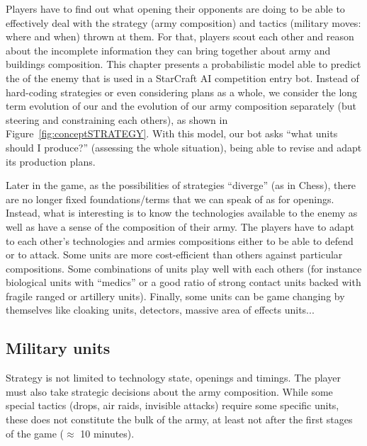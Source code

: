 Players have to find out what opening their opponents are doing to be able to effectively deal with the strategy (army composition) and tactics (military moves: where and when) thrown at them. For that, players scout each other and reason about the incomplete information they can bring together about army and buildings composition. This chapter presents a probabilistic model able to predict the \textit{} of the enemy that is used in a StarCraft AI competition entry bot. Instead of hard-coding strategies or even considering plans as a whole, we consider the long term evolution of our  and the evolution of our army composition separately (but steering and constraining each others), as shown in Figure~\ref{fig:conceptSTRATEGY}. With this model, our bot asks ``what units should I produce?'' (assessing the whole situation), being able to revise and adapt its production plans.

Later in the game, as the possibilities of strategies ``diverge'' (as in Chess), there are no longer fixed foundations/terms that we can speak of as for openings. Instead, what is interesting is to know the technologies available to the enemy as well as have a sense of the composition of their army. The players have to adapt to each other's technologies and armies compositions either to be able to defend or to attack. Some units are more cost-efficient than others against particular compositions. Some combinations of units play well with each others (for instance biological units with ``medics'' or a good ratio of strong contact units backed with fragile ranged or artillery units). Finally, some units can be game changing by themselves like cloaking units, detectors, massive area of effects units... 

\subsection{Military units}
\label{sec:militaryunits}
Strategy is not limited to technology state, openings and timings. The player must also take strategic decisions about the army composition. While some special tactics (drops, air raids, invisible attacks) require some specific units, these does not constitute the bulk of the army, at least not after the first stages of the game ($\approx$ 10 minutes).

